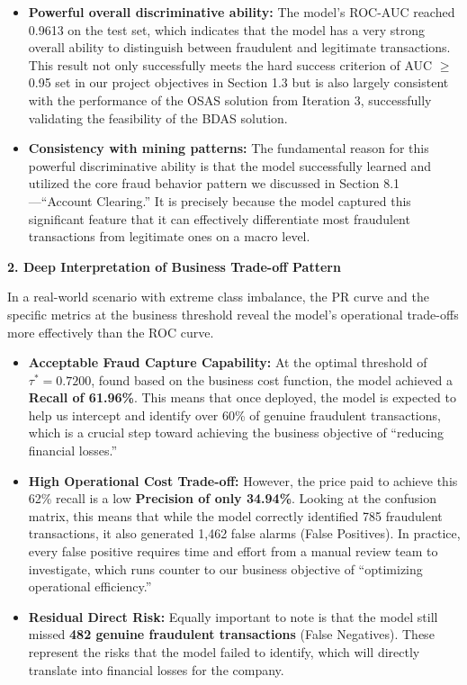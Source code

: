\documentclass[sigplan,screen]{acmart}
\begin{document}
\begin{itemize}
\item \textbf{Powerful overall discriminative ability:} The model's ROC-AUC reached 0.9613 on the test set, which indicates that the model has a very strong overall ability to distinguish between fraudulent and legitimate transactions. This result not only successfully meets the hard success criterion of AUC $\geq$ 0.95 set in our project objectives in Section 1.3 but is also largely consistent with the performance of the OSAS solution from Iteration 3, successfully validating the feasibility of the BDAS solution.

\item \textbf{Consistency with mining patterns:} The fundamental reason for this powerful discriminative ability is that the model successfully learned and utilized the core fraud behavior pattern we discussed in Section 8.1---``Account Clearing.'' It is precisely because the model captured this significant feature that it can effectively differentiate most fraudulent transactions from legitimate ones on a macro level.
\end{itemize}

\textbf{2. Deep Interpretation of Business Trade-off Pattern}

In a real-world scenario with extreme class imbalance, the PR curve and the specific metrics at the business threshold reveal the model's operational trade-offs more effectively than the ROC curve.

\begin{itemize}
\item \textbf{Acceptable Fraud Capture Capability:} At the optimal threshold of $\tau^* = 0.7200$, found based on the business cost function, the model achieved a \textbf{Recall of 61.96\%}. This means that once deployed, the model is expected to help us intercept and identify over 60\% of genuine fraudulent transactions, which is a crucial step toward achieving the business objective of ``reducing financial losses.''

\item \textbf{High Operational Cost Trade-off:} However, the price paid to achieve this 62\% recall is a low \textbf{Precision of only 34.94\%}. Looking at the confusion matrix, this means that while the model correctly identified 785 fraudulent transactions, it also generated 1,462 false alarms (False Positives). In practice, every false positive requires time and effort from a manual review team to investigate, which runs counter to our business objective of ``optimizing operational efficiency.''

\item \textbf{Residual Direct Risk:} Equally important to note is that the model still missed \textbf{482 genuine fraudulent transactions} (False Negatives). These represent the risks that the model failed to identify, which will directly translate into financial losses for the company.
\end{itemize}
\end{document}
